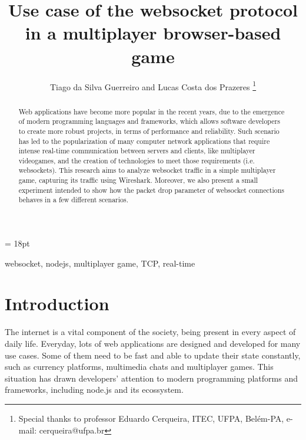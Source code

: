 \documentclass[english]{sbrt}
\begin{document}
\title{Use case of the websocket protocol in a multiplayer browser-based game}

\author{Tiago da Silva Guerreiro and Lucas Costa dos Prazeres
  \thanks{Special thanks to professor Eduardo Cerqueira, ITEC, UFPA, Belém-PA, e-mail: cerqueira@ufpa.br}
}

\maketitle

\baselineskip = 18pt


\begin{abstract}
  Web applications have become more popular in the recent years, due to the emergence of modern programming languages and frameworks, which allows software developers to create more robust projects, in terms of performance and reliability.
  Such scenario has led to the popularization of many computer network applications that require intense real-time communication between servers and clients, like multiplayer videogames, and the creation of technologies to meet those requirements (i.e. websockets).
  This research aims to analyze websocket traffic in a simple multiplayer game, capturing its traffic using Wireshark.
  Moreover, we also present a small experiment intended to show how the packet drop parameter of websocket connections behaves in a few different scenarios.

\end{abstract}
\begin{keywords}
  websocket, nodejs, multiplayer game, TCP, real-time
\end{keywords}

\section{\textbf{Introduction}}

The internet is a vital component of the society, being present in every aspect of daily life.
Everyday, lots of web applications are designed and developed for
many use cases. Some of them need to be fast and able to update their state constantly, such as currency platforms, multimedia chats and multiplayer games.
This situation has drawn developers' attention to modern programming platforms and frameworks, including node.js and its ecossystem.
\end{document}
